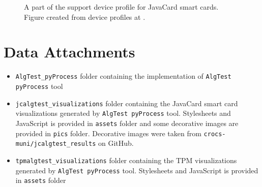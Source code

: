 \begin{figure}
    \centering
    
    \caption{A part of the support device profile for JavaCard smart cards. Figure created from device profiles at \cite{jcalgtestResultsRepo}.}
\end{figure}

\renewcommand{\thechapter}{D}
\chapter{Data Attachments}
\begin{itemize}
    \item \texttt{AlgTest\_pyProcess} folder containing the implementation of \texttt{AlgTest pyProcess} tool
    \item \texttt{jcalgtest\_visualizations} folder containing the JavaCard smart card visualizations generated by \texttt{AlgTest pyProcess} tool. Stylesheets and JavaScript is provided in \texttt{assets} folder and some decorative images are provided in \texttt{pics} folder. Decorative images were taken from \texttt{crocs-muni/jcalgtest\_results} on GitHub.
    
    \item \texttt{tpmalgtest\_visualizations} folder containing the TPM visualizations generated by \texttt{AlgTest pyProcess} tool. Stylesheets and JavaScript is provided in \texttt{assets} folder 
\end{itemize}
